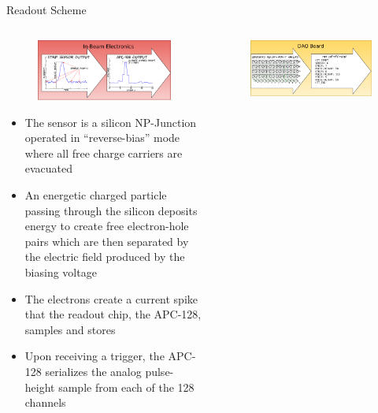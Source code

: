 \documentclass[final]{beamer}
\newlength{\onecolwide}
\newlength{\readoutimgheight}
\newlength{\readoutimgwidth}
\begin{document}
\begin{frame}[t]
\vspace{2.7in}
\begin{exampleblock}{Readout Scheme}
  \begin{columns}[t]
    \begin{column}{\onecolwide}
      \begin{figure}
        \centering
        \includegraphics[height=\readoutimgheight, width=\readoutimgwidth]{../figures/Telescope_Data_Flow_Stage_I.pdf}
      \end{figure}
        \begin{itemize}
        \footnotesize
        \itemsep0em 
          \item The sensor is a silicon NP-Junction operated in ``reverse-bias'' mode where all free charge carriers are evacuated
          \item An energetic charged particle passing through the silicon deposits energy to create free electron-hole pairs which are then separated by the electric field produced by the biasing voltage
          \item The electrons create a current spike that the readout chip, the APC-128, samples and stores
          \item Upon receiving a trigger, the APC-128 serializes the analog pulse-height sample from each of the 128 channels
        \end{itemize}
    \end{column}
    \begin{column}{\onecolwide}
      \begin{figure}
        \centering
        \includegraphics[height=\readoutimgheight, width=\readoutimgwidth]{../figures/Telescope_Data_Flow_Stage_II.pdf}

\end{figure}
\end{column}
\end{columns}
\end{exampleblock}
\end{frame}
\end{document}
